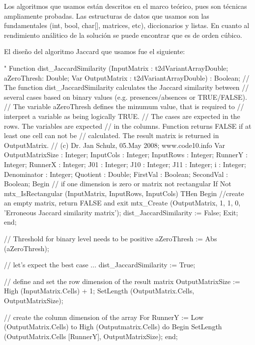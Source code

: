 \documentclass[fleqn,10pt]{SelfArx} %
\begin{document}
Los algoritmos que usamos están descritos en el marco teórico, pues son técnicas ampliamente probadas.
Las estructuras de datos que usamos son las fundamentales (int, bool, char[], matrices, etc), diccionarios y listas.
En cuanto al rendimiento análitico de la solución se puede encontrar que es de orden cúbico.

El diseño del algoritmo Jaccard que usamos fue el siguiente:

"
Function dist_JaccardSimilarity (InputMatrix : t2dVariantArrayDouble; aZeroThresh: Double; Var OutputMatrix : t2dVariantArrayDouble) : Boolean;
// The function dist_JaccardSimilarity calculates the Jaccard similarity between
// several cases based on binary values (e.g. presences/absences or TRUE/FALSE).
// The variable aZeroThresh defines the minumum value, that is required to
// interpret a variable as being logically TRUE.
// The cases are expected in the rows. The variables are expected
// in the columns. Function returns FALSE if at least one cell can not be
// calculated. The result matrix is returned in OutputMatrix.
// (c) Dr. Jan Schulz, 05.May 2008; www.code10.info
Var  OutputMatrixSize : Integer;
     InputCols        : Integer;
     InputRows        : Integer;
     RunnerY          : Integer;
     RunnerX          : Integer;
     J01              : Integer;
     J10              : Integer;
     J11              : Integer;
     i                : Integer;
     Denominator      : Integer;
     Quotient         : Double;
     FirstVal         : Boolean;
     SecondVal        : Boolean;
Begin
  // if one dimension is zero or matrix not rectangular
  If Not mtx_IsRectangular (InputMatrix, InputRows, InputCols) THen
  Begin
    //create an empty matrix, return FALSE and exit
    mtx_Create (OutputMatrix, 1, 1, 0, 'Erroneous Jaccard similarity matrix');
    dist_JaccardSimilarity := False;
    Exit;
  end;

  // Threshold for binary level needs to be positive
  aZeroThresh := Abs (aZeroThresh);

  // let's expect the best case ...
  dist_JaccardSimilarity := True;

  // define and set the row dimension of the result matrix
  OutputMatrixSize := High (InputMatrix.Cells) + 1;
  SetLength (OutputMatrix.Cells, OutputMatrixSize);

  // create the column dimension of the array
  For RunnerY := Low (OutputMatrix.Cells) to High (Outputmatrix.Cells) do
  Begin
    SetLength (OutputMatrix.Cells [RunnerY], OutputMatrixSize);
  end;
\end{document}

